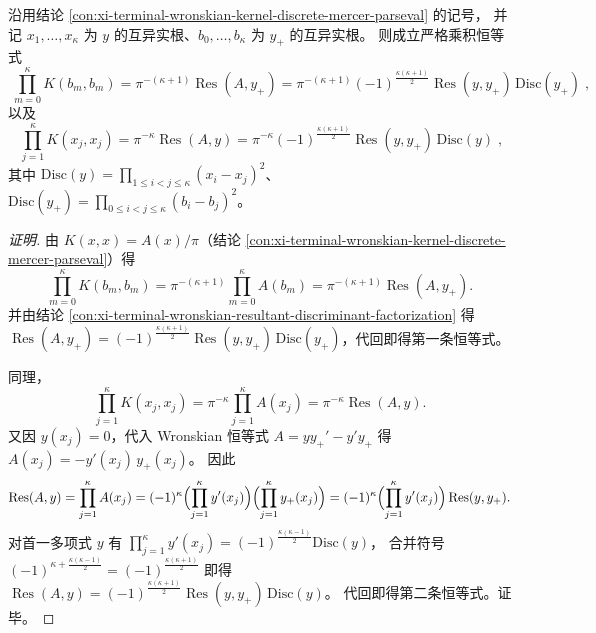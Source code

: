 
\begin{conclusion}\label{con:xi-terminal-wronskian-diagonal-sampling-resultant-discriminant-product}
沿用结论 \ref{con:xi-terminal-wronskian-kernel-discrete-mercer-parseval} 的记号，
并记 \(x_1,\dots,x_\kappa\) 为 \(y\) 的互异实根、\(b_0,\dots,b_\kappa\) 为 \(y_{+}\) 的互异实根。
则成立严格乘积恒等式
\[
\boxed{\;
\prod_{m=0}^{\kappa}K(b_m,b_m)
=\pi^{-(\kappa+1)}\operatorname{Res}(A,y_{+})
=\pi^{-(\kappa+1)}(-1)^{\frac{\kappa(\kappa+1)}{2}}\operatorname{Res}(y,y_{+})\,\mathrm{Disc}(y_{+})\;},
\]
以及
\[
\boxed{\;
\prod_{j=1}^{\kappa}K(x_j,x_j)
=\pi^{-\kappa}\operatorname{Res}(A,y)
=\pi^{-\kappa}(-1)^{\frac{\kappa(\kappa+1)}{2}}\operatorname{Res}(y,y_{+})\,\mathrm{Disc}(y)\;},
\]
其中
\(
\mathrm{Disc}(y)=\prod_{1\le i<j\le \kappa}(x_i-x_j)^2
\)、
\(
\mathrm{Disc}(y_{+})=\prod_{0\le i<j\le \kappa}(b_i-b_j)^2
\)。
\end{conclusion}
\begin{proof}[证明]
由 \(K(x,x)=A(x)/\pi\)（结论 \ref{con:xi-terminal-wronskian-kernel-discrete-mercer-parseval}）得
\[
\prod_{m=0}^{\kappa}K(b_m,b_m)=\pi^{-(\kappa+1)}\prod_{m=0}^{\kappa}A(b_m)
=\pi^{-(\kappa+1)}\operatorname{Res}(A,y_{+}).
\]
并由结论 \ref{con:xi-terminal-wronskian-resultant-discriminant-factorization} 得
\(
\operatorname{Res}(A,y_{+})
=(-1)^{\frac{\kappa(\kappa+1)}{2}}\operatorname{Res}(y,y_{+})\,\mathrm{Disc}(y_{+})
\)，代回即得第一条恒等式。
\par
同理，
\[
\prod_{j=1}^{\kappa}K(x_j,x_j)=\pi^{-\kappa}\prod_{j=1}^{\kappa}A(x_j)
=\pi^{-\kappa}\operatorname{Res}(A,y).
\]
又因 \(y(x_j)=0\)，代入 Wronskian 恒等式 \(A=yy_{+}'-y'y_{+}\) 得
\(
A(x_j)=-y'(x_j)\,y_{+}(x_j)
\)。
因此
\[
\operatorname{Res}(A,y)
=\prod_{j=1}^{\kappa}A(x_j)
=(-1)^{\kappa}\Bigl(\prod_{j=1}^{\kappa}y'(x_j)\Bigr)\Bigl(\prod_{j=1}^{\kappa}y_{+}(x_j)\Bigr)
=(-1)^{\kappa}\Bigl(\prod_{j=1}^{\kappa}y'(x_j)\Bigr)\operatorname{Res}(y,y_{+}).
\]
对首一多项式 \(y\) 有
\(
\prod_{j=1}^{\kappa}y'(x_j)=(-1)^{\frac{\kappa(\kappa-1)}{2}}\mathrm{Disc}(y)
\)，
合并符号 \( (-1)^{\kappa+\frac{\kappa(\kappa-1)}{2}}=(-1)^{\frac{\kappa(\kappa+1)}{2}} \) 即得
\(
\operatorname{Res}(A,y)
=(-1)^{\frac{\kappa(\kappa+1)}{2}}\operatorname{Res}(y,y_{+})\,\mathrm{Disc}(y)
\)。
代回即得第二条恒等式。证毕。
\end{proof}

